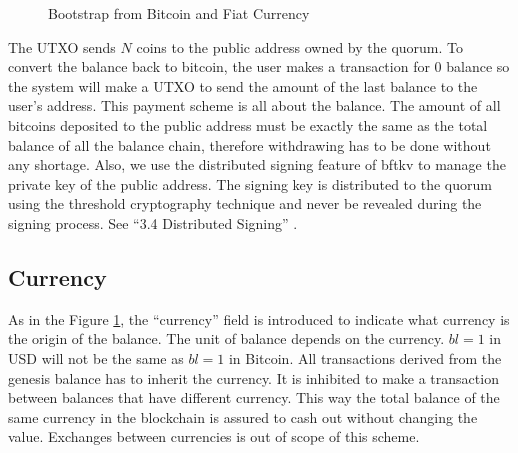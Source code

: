 \documentclass[10pt,fleqn]{article}
\begin{document}
\begin{figure}[H]
\begin{center}
\end{center}
\label{bootstrap}
\caption{Bootstrap from Bitcoin and Fiat Currency}
\end{figure}

The UTXO sends $N$ coins to the public address owned by the quorum. To convert the balance back to bitcoin, the user makes a transaction for $0$ balance so the system will make a UTXO to send the amount of the last balance to the user's address.
This payment scheme is all about the balance. The amount of all bitcoins deposited to the public address must be exactly the same as the total balance of all the balance chain, therefore withdrawing has to be done without any shortage.
Also, we use the distributed signing feature of {\sf bftkv} to manage the private key of the public address. The signing key is distributed to the quorum using the threshold cryptography technique and never be revealed during the signing process. See ``3.4 Distributed Signing'' \cite{bftkv}.

\subsection{Currency}
As in the Figure \ref{bootstrap}, the ``currency'' field is introduced to indicate what currency is the origin of the balance. The unit of balance depends on the currency. $bl=1$ in USD will not be the same as $bl=1$ in Bitcoin. All transactions derived from the genesis balance has to inherit the currency. It is inhibited to make a transaction between balances that have different currency. This way the total balance of the same currency in the blockchain is assured to cash out without changing the value. Exchanges between currencies is out of scope of this scheme.
\end{document}
